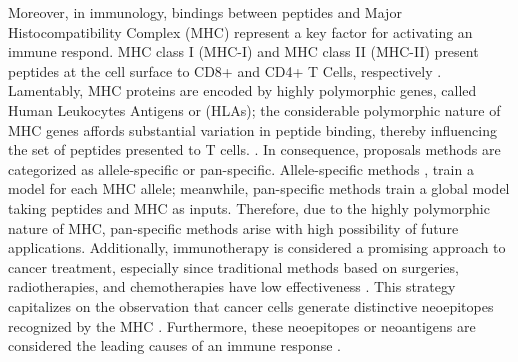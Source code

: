 \documentclass[a4paper,11pt]{article}
\begin{document}
Moreover, in immunology, bindings between peptides and Major Histocompatibility Complex (MHC) represent a key factor for activating an immune respond. MHC class I (MHC-I) and MHC class II (MHC-II) present peptides at the cell surface to CD8+ and CD4+ T Cells, respectively \cite{janeway1997immunobiology,abualrous2021major}. Lamentably, MHC proteins are encoded by highly polymorphic genes, called Human Leukocytes Antigens or (HLAs); the considerable polymorphic nature of MHC genes affords substantial variation in peptide binding, thereby influencing the set of peptides presented to T cells. \cite{abualrous2021major}. In consequence, proposals methods are categorized as allele-specific or pan-specific. Allele-specific methods \cite{rammensee1999syfpeithi,reche2002prediction,kim2009derivation,nielsen2016netmhcpan,vang2017hla,shao2020high,bravi2021rbm}, train a model for each MHC allele; meanwhile, pan-specific methods \cite{hu2019acme,liu2019deepseqpan,wu2019deephlapan,phloyphisut2019mhcseqnet,o2018mhcflurry,o2020mhcflurry,reynisson2020netmhcpan,venkatesh2020mhcattnnet,ye2021mathla,mei2021anthem,chu2022transformer,zhang2022hlab} train a global model taking peptides and MHC as inputs. Therefore, due to the highly polymorphic nature of MHC, pan-specific methods arise with high possibility of future applications. Additionally, immunotherapy is considered a promising approach to cancer treatment, especially since traditional methods based on surgeries, radiotherapies, and chemotherapies have low effectiveness \cite{peng2019neoantigen,thakur2022pursuit}. This strategy capitalizes on the observation that cancer cells generate distinctive neoepitopes recognized by the MHC \cite{durgeau2018recent}. Furthermore, these neoepitopes or neoantigens are considered the leading causes of an immune response \cite{borden2022cancer,chen2021challenges,gopanenko2020main}. \\
\end{document}
